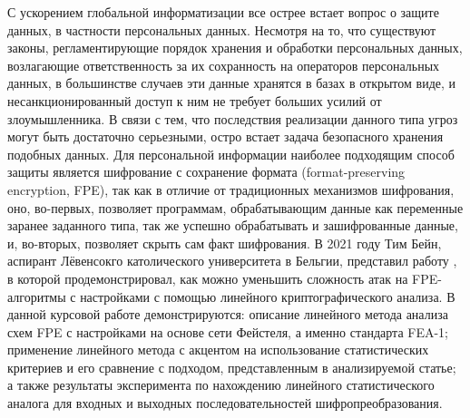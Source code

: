 \Introduction

 С ускорением глобальной информатизации все острее встает вопрос о защите данных, в частности персональных данных. Несмотря на то, что существуют законы, регламентирующие порядок хранения и обработки персональных данных, возлагающие ответственность за их сохранность на операторов персональных данных, в большинстве случаев эти данные хранятся в базах в открытом виде, и несанкционированный доступ к ним не требует больших усилий от злоумышленника. В связи с тем, что последствия реализации данного типа угроз могут быть достаточно серьезными, остро встает задача безопасного хранения подобных данных. Для персональной информации наиболее подходящим способ защиты является шифрование с сохранение формата (format-preserving encryption, FPE), так как в отличие от традиционных механизмов шифрования, оно, во-первых, позволяет программам, обрабатывающим данные как переменные заранее заданного типа, так же успешно обрабатывать и зашифрованные данные, и, во-вторых, позволяет скрыть сам факт шифрования. 
 В 2021 году  Тим Бейн, аспирант Лёвенсокго католического университета в Бельгии, представил работу \cite{main_paper}, в которой продемонстрировал, как можно уменьшить сложность атак на FPE-алгоритмы с настройками с помощью линейного криптографического анализа. В данной курсовой работе демонстрируются: описание линейного метода анализа схем FPE с настройками на основе сети Фейстеля, а именно стандарта FEA-1; применение линейного метода с акцентом на использование статистических критериев и его сравнение с подходом, представленным в анализируемой статье; а также результаты эксперимента по нахождению линейного статистического аналога для входных и выходных последовательностей шифропреобразования.
